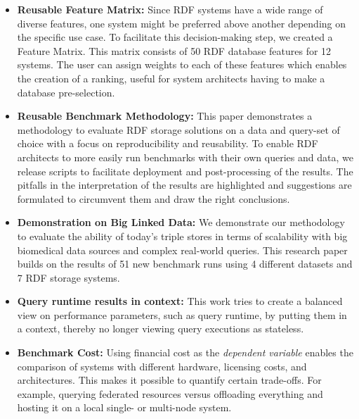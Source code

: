 \documentclass[twocolumn]{bmcart}%
\newcommand\todo[1]{\textcolor{red}{#1}}
\begin{document}
\begin{itemize}
	\item \textbf{Reusable Feature Matrix:} Since RDF systems have a wide range of diverse features, one system might be preferred above another depending on the specific use case. To facilitate this decision-making step, we created a Feature Matrix. This matrix consists of 50 RDF database features for 12 systems.  The user can assign weights to each of these features which enables the creation of a ranking, useful for system architects having to make a database pre-selection.
	\item \textbf{Reusable Benchmark Methodology:} This paper demonstrates a methodology to evaluate RDF storage solutions on a data and query-set of choice with a focus on reproducibility and reusability. To enable RDF architects to more easily run benchmarks with their own queries and data, we release scripts to facilitate deployment and post-processing of the results. The pitfalls in the interpretation of the results  are highlighted and suggestions are formulated to circumvent them and draw the right conclusions. 
	\item \textbf{Demonstration on Big Linked Data:} We demonstrate our methodology to evaluate the ability of today's triple stores in terms of scalability with big biomedical data sources and complex real-world queries. This research paper builds on the results of 51 new benchmark runs using 4 different datasets and 7 RDF storage systems. 
	\item \textbf{Query runtime results in context:} This work tries to create a balanced view on performance parameters, such as query runtime, by putting them in a context, thereby no longer viewing query executions as stateless. 
	\item \textbf{Benchmark Cost:} Using financial cost as the \emph{dependent variable} enables the comparison of systems with different hardware, licensing costs, and architectures. This makes it possible to quantify certain trade-offs. For example, querying federated resources versus offloading everything and hosting it on a local single- or multi-node system.
\end{itemize}
\end{document}
